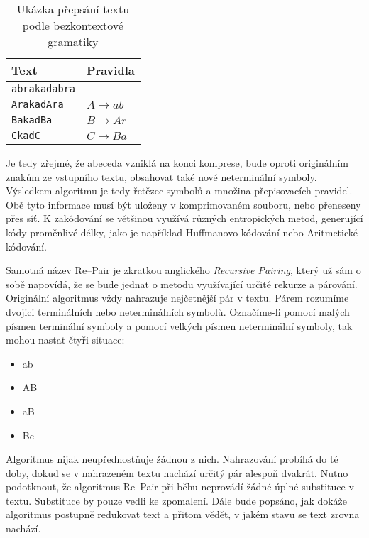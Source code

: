 \documentclass[a4paper,12pt]{article}
\begin{document}
\begin{table}[h!]
    \centering
    \begin{tabular}{l | l}
    \toprule
    Text                 &   Pravidla            \\ \midrule
    \texttt{abrakadabra} &                       \\
    \texttt{ArakadAra}   &  $A \rightarrow ab $  \\
    \texttt{BakadBa}     &  $B \rightarrow Ar $  \\
    \texttt{CkadC}       &  $C \rightarrow Ba $  \\
    \bottomrule
    \end{tabular}
    \caption{Ukázka přepsání textu podle bezkontextové gramatiky}
    \label{tab:cfg}
\end{table}

Je tedy zřejmé, že abeceda vzniklá na konci komprese, bude oproti originálním znakům ze vstupního textu, obsahovat také nové neterminální symboly. Výsledkem algoritmu je tedy řetězec symbolů a množina přepisovacích pravidel. Obě tyto informace musí být uloženy v komprimovaném souboru, nebo přeneseny přes síť. K zakódování se většinou využívá různých entropických metod, generující kódy proměnlivé délky, jako je například Huffmanovo kódování nebo Aritmetické kódování.

Samotná název Re--Pair je zkratkou anglického \emph{Recursive Pairing}, který už sám o sobě napovídá, že se bude jednat o metodu využívající určité rekurze a párování. Originální algoritmus vždy nahrazuje nejčetnější pár v textu. Párem rozumíme dvojici terminálních nebo neterminálních symbolů. Označíme-li pomocí malých písmen terminální symboly \linebreak a pomocí velkých písmen neterminální symboly, tak mohou nastat čtyři situace:

\begin{itemize}
    \item ab
    \item AB
    \item aB
    \item Bc
\end{itemize}

\noindent Algoritmus nijak neupřednostňuje žádnou z nich. Nahrazování probíhá do té doby, dokud se v nahrazeném textu nachází určitý pár alespoň dvakrát. Nutno podotknout, že algoritmus Re--Pair při běhu neprovádí žádné úplné substituce v textu. Substituce by pouze vedli ke zpomalení. Dále bude popsáno, jak dokáže algoritmus postupně redukovat text \linebreak a přitom vědět, v jakém stavu se text zrovna nachází.
\end{document}
